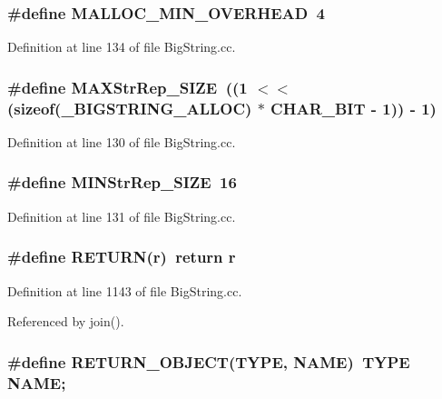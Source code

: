 \subsubsection{\setlength{\rightskip}{0pt plus 5cm}\#define MALLOC\_\-MIN\_\-OVERHEAD\ 4}\label{BigString_8cc_a2}




Definition at line 134 of file Big\-String.cc.
\subsubsection{\setlength{\rightskip}{0pt plus 5cm}\#define MAXStr\-Rep\_\-SIZE\ ((1 $<$$<$ (sizeof({\bf \_\-BIGSTRING\_\-ALLOC}) $\ast$ CHAR\_\-BIT - 1)) - 1)}\label{BigString_8cc_a0}




Definition at line 130 of file Big\-String.cc.
\subsubsection{\setlength{\rightskip}{0pt plus 5cm}\#define MINStr\-Rep\_\-SIZE\ 16}\label{BigString_8cc_a1}




Definition at line 131 of file Big\-String.cc.
\subsubsection{\setlength{\rightskip}{0pt plus 5cm}\#define RETURN(r)\ return r}\label{BigString_8cc_a3}




Definition at line 1143 of file Big\-String.cc.

Referenced by join().
\subsubsection{\setlength{\rightskip}{0pt plus 5cm}\#define RETURN\_\-OBJECT(TYPE, NAME)\ TYPE NAME;}\label{BigString_8cc_a5}




